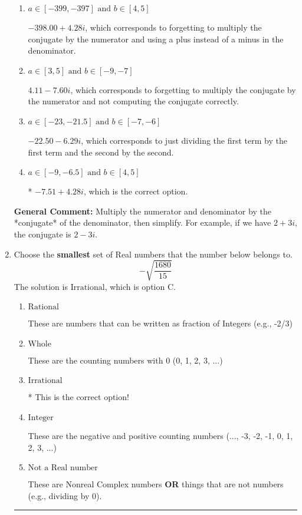 \documentclass{extbook}[14pt]
\newcommand{\litem}[1]{\item #1

\rule{\textwidth}{0.4pt}}
\begin{document}
\begin{enumerate}
{\begin{enumerate}[label=\Alph*.]
 $-7.51  + 227.00 i$, which corresponds to forgetting to multiply the conjugate by the numerator.
\item \( a \in [-399, -397] \text{ and } b \in [4, 5] \)

 $-398.00  + 4.28 i$, which corresponds to forgetting to multiply the conjugate by the numerator and using a plus instead of a minus in the denominator.
\item \( a \in [3, 5] \text{ and } b \in [-9, -7] \)

 $4.11  - 7.60 i$, which corresponds to forgetting to multiply the conjugate by the numerator and not computing the conjugate correctly.
\item \( a \in [-23, -21.5] \text{ and } b \in [-7, -6] \)

 $-22.50  - 6.29 i$, which corresponds to just dividing the first term by the first term and the second by the second.
\item \( a \in [-9, -6.5] \text{ and } b \in [4, 5] \)

* $-7.51  + 4.28 i$, which is the correct option.
\end{enumerate}

\textbf{General Comment:} Multiply the numerator and denominator by the *conjugate* of the denominator, then simplify. For example, if we have $2+3i$, the conjugate is $2-3i$.
}
\litem{
Choose the \textbf{smallest} set of Real numbers that the number below belongs to.
\[ -\sqrt{\frac{1680}{15}} \]The solution is \( \text{Irrational} \), which is option C.\begin{enumerate}[label=\Alph*.]
\item \( \text{Rational} \)

These are numbers that can be written as fraction of Integers (e.g., -2/3)
\item \( \text{Whole} \)

These are the counting numbers with 0 (0, 1, 2, 3, ...)
\item \( \text{Irrational} \)

* This is the correct option!
\item \( \text{Integer} \)

These are the negative and positive counting numbers (..., -3, -2, -1, 0, 1, 2, 3, ...)
\item \( \text{Not a Real number} \)

These are Nonreal Complex numbers \textbf{OR} things that are not numbers (e.g., dividing by 0).
\end{enumerate}

}
\end{enumerate}
\end{document}
